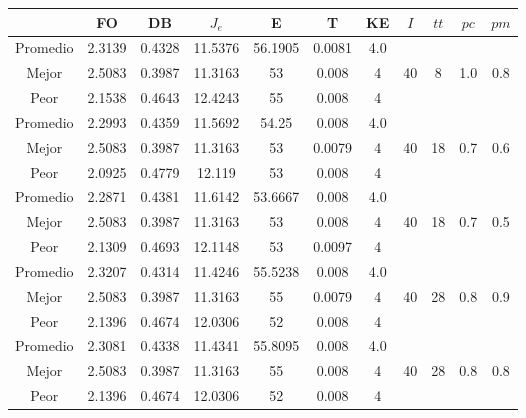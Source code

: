 \begin{table}[h!]
    \footnotesize
    \begin{center}
        \begin{tabular}{|c|c|c|c|c|c|c|c|c|c|c|}
        \hline
             & {\bf FO} & {\bf DB} & $J_e$ & {\bf E} & {\bf T} & {\bf KE} & $I$ & $tt$ & $pc$ & $pm$ \\
        \hline
        \hline
            Promedio  & 2.3139 & 0.4328 & 11.5376 & 56.1905 & 0.0081 & 4.0 &  &  &  & \\
            \cline{1-7}
            Mejor & 2.5083 & 0.3987  & 11.3163 & 53 & 0.008 & 4 & 40 & 8 & 1.0 & 0.8\\
            \cline{1-7}
            Peor & 2.1538 & 0.4643  & 12.4243 & 55 & 0.008 & 4 &  &  &  & \\
        \hline
        \hline
            Promedio  & 2.2993 & 0.4359 & 11.5692 & 54.25 & 0.008 & 4.0 &  &  &  & \\
            \cline{1-7}
            Mejor & 2.5083 & 0.3987  & 11.3163 & 53 & 0.0079 & 4 & 40 & 18 & 0.7 & 0.6\\
            \cline{1-7}
            Peor & 2.0925 & 0.4779  & 12.119 & 53 & 0.008 & 4 &  &  &  & \\
        \hline
        \hline
            Promedio  & 2.2871 & 0.4381 & 11.6142 & 53.6667 & 0.008 & 4.0 &  &  &  & \\
            \cline{1-7}
            Mejor & 2.5083 & 0.3987  & 11.3163 & 53 & 0.008 & 4 & 40 & 18 & 0.7 & 0.5\\
            \cline{1-7}
            Peor & 2.1309 & 0.4693  & 12.1148 & 53 & 0.0097 & 4 &  &  &  & \\
        \hline
        \hline
            Promedio  & 2.3207 & 0.4314 & 11.4246 & 55.5238 & 0.008 & 4.0 &  &  &  & \\
            \cline{1-7}
            Mejor & 2.5083 & 0.3987  & 11.3163 & 55 & 0.0079 & 4 & 40 & 28 & 0.8 & 0.9\\
            \cline{1-7}
            Peor & 2.1396 & 0.4674  & 12.0306 & 52 & 0.008 & 4 &  &  &  & \\
        \hline
        \hline
            Promedio  & 2.3081 & 0.4338 & 11.4341 & 55.8095 & 0.008 & 4.0 &  &  &  & \\
            \cline{1-7}
            Mejor & 2.5083 & 0.3987  & 11.3163 & 55 & 0.008 & 4 & 40 & 28 & 0.8 & 0.8\\
            \cline{1-7}
            Peor & 2.1396 & 0.4674  & 12.0306 & 52 & 0.008 & 4 &  &  &  & \\

\end{tabular}
\end{center}
\end{table}
